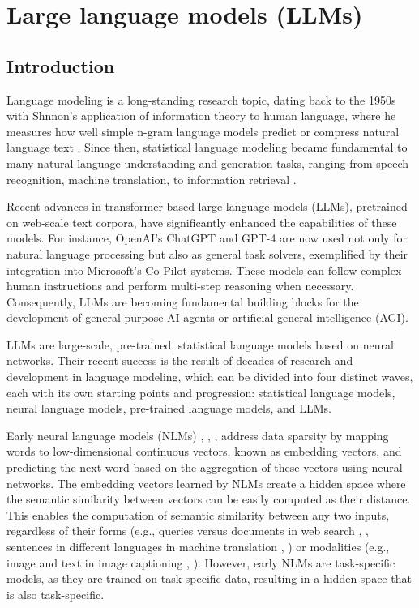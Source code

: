 \section{Large language models (LLMs)}

\subsection{Introduction}

Language modeling is a long-standing research topic, dating back to the 1950s with Shnnon's application of information theory to human language, where he measures how well simple n-gram language models predict or compress natural language text \cite{6773263}. Since then, statistical language modeling became fundamental to many natural language understanding and generation tasks, ranging from speech recognition, machine translation, to information retrieval \cite{Jelinek1997StatisticalMF} \cite{Manning_Raghavan_Schütze_2008}.

Recent advances in transformer-based large language models (LLMs), pretrained on web-scale text corpora, have significantly enhanced the capabilities of these models. For instance, OpenAI's ChatGPT and GPT-4 are now used not only for natural language processing but also as general task solvers, exemplified by their integration into Microsoft's Co-Pilot systems. These models can follow complex human instructions and perform multi-step reasoning when necessary. Consequently, LLMs are becoming fundamental building blocks for the development of general-purpose AI agents or artificial general intelligence (AGI).

LLMs are large-scale, pre-trained, statistical language models based on neural networks. Their recent success is the result of decades of research and development in language modeling, which can be divided into four distinct waves, each with its own starting points and progression: statistical language models, neural language models, pre-trained language models, and LLMs.

Early neural language models (NLMs) \cite{NIPS2000_728f206c}, \cite{schwenk-etal-2006-continuous}, \cite{mikolov10_interspeech}, \cite{graves2014generating} address data sparsity by mapping words to low-dimensional continuous vectors, known as embedding vectors, and predicting the next word based on the aggregation of these vectors using neural networks. The embedding vectors learned by NLMs create a hidden space where the semantic similarity between vectors can be easily computed as their distance. This enables the computation of semantic similarity between any two inputs, regardless of their forms (e.g., queries versus documents in web search \cite{10.1145/2505515.2505665}, \cite{gao2022neural}, sentences in different languages in machine translation \cite{sutskever2014sequence}, \cite{cho2014properties}) or modalities (e.g., image and text in image captioning \cite{cho2014properties}, \cite{vinyals2015tell}). However, early NLMs are task-specific models, as they are trained on task-specific data, resulting in a hidden space that is also task-specific.

